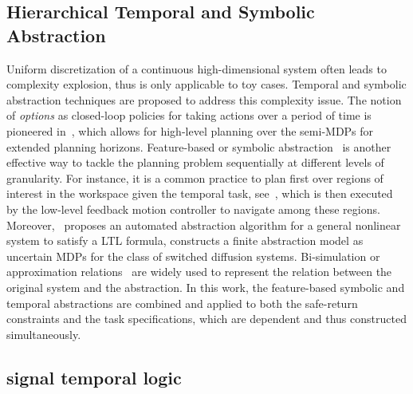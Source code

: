 \subsection{Hierarchical Temporal and Symbolic Abstraction}\label{subsec:abstraction}
Uniform discretization of a continuous high-dimensional system often leads to complexity explosion,
thus is only applicable to toy cases.
{Temporal and symbolic abstraction techniques are proposed to address this complexity issue.
  The notion of \emph{options} as closed-loop policies for taking actions over a period of time is pioneered in~\cite{sutton1999between}, which allows for high-level planning over the semi-MDPs for extended planning horizons.
Feature-based or symbolic abstraction~\cite{tabuada2009verification} is another effective way to tackle the planning problem
sequentially at different levels of granularity.} For instance,
it is a common practice to plan first over regions of interest in the workspace given the temporal task, see~\cite{guo2015multi, ding2014optimal, tumova2016multi, kantaros2018control},
which is then executed by the low-level feedback motion controller to navigate among these regions.
Moreover,~\cite{meyer2019hierarchical, nilsson2014incremental} proposes an automated abstraction algorithm for a general nonlinear system to satisfy a LTL formula,
\cite{laurenti2020formal} constructs a finite abstraction model as uncertain MDPs for the class of switched diffusion systems.
Bi-simulation or approximation relations~\cite{haesaert2017verification} are widely used to represent the relation between the original system and the abstraction.
{In this work, the feature-based symbolic and temporal abstractions are combined and applied to
  both the safe-return constraints and the task specifications,
  which are dependent and thus constructed simultaneously.}


\subsection{signal temporal logic}\label{subsec:stl}

